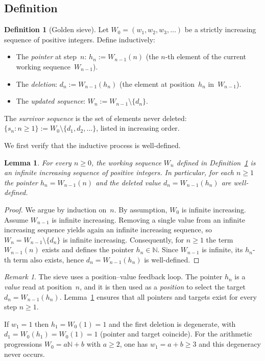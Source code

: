\documentclass[11pt]{article}
\numberwithin{equation}{section}
\theoremstyle{plain}
\newtheorem{lemma}[theorem]{Lemma}
\theoremstyle{definition}
\newtheorem{definition}[theorem]{Definition}
\theoremstyle{remark}
\newtheorem{remark}[theorem]{Remark}
\newcommand{\N}{\mathbb{N}}
\begin{document}
\subsection{Definition}

\begin{definition}[Golden sieve]\label{def:sieve}
Let $W_0 = (w_1, w_2, w_3, \ldots)$ be a strictly increasing sequence
of positive integers.  Define inductively:
\begin{itemize}
\item The \emph{pointer} at step~$n$:
  $h_n := W_{n-1}(n)$ (the $n$-th element of the current working
  sequence~$W_{n-1}$).
\item The \emph{deletion}: $d_n := W_{n-1}(h_n)$ (the element at
  position~$h_n$ in~$W_{n-1}$).
\item The \emph{updated sequence}: $W_n := W_{n-1} \setminus \{d_n\}$.
\end{itemize}
The \emph{survivor sequence} is the set of elements never deleted:
$\{s_n : n \ge 1\} := W_0 \setminus \{d_1, d_2, \ldots\}$,
listed in increasing order.
\end{definition}

We first verify that the inductive process is well-defined.

\begin{lemma}\label{lem:well-defined}
For every $n\ge0$, the working sequence $W_n$ defined in
Definition~\ref{def:sieve} is an infinite increasing sequence of positive
integers. In particular, for each $n\ge1$ the pointer $h_n=W_{n-1}(n)$ and
the deleted value $d_n=W_{n-1}(h_n)$ are well-defined.
\end{lemma}

\begin{proof}
We argue by induction on~$n$. By assumption, $W_0$ is infinite increasing.
Assume $W_{n-1}$ is infinite increasing. Removing a single value from an
infinite increasing sequence yields again an infinite increasing sequence,
so $W_n=W_{n-1}\setminus\{d_n\}$ is infinite increasing.
Consequently, for $n\ge1$ the term $W_{n-1}(n)$ exists and defines the
pointer $h_n\in\N$. Since $W_{n-1}$ is infinite, its $h_n$-th term also
exists, hence $d_n=W_{n-1}(h_n)$ is well-defined.
\end{proof}

\begin{remark}%
\label{rem:degeneracy-initial}
The sieve uses a position--value feedback loop.  The pointer $h_n$ is a
\emph{value} read at position~$n$, and it is then used as a \emph{position}
to select the target $d_n=W_{n-1}(h_n)$. Lemma~\ref{lem:well-defined}
ensures that all pointers and targets exist for every step $n\ge1$.

If $w_1=1$ then $h_1=W_0(1)=1$ and the first deletion is degenerate, with
$d_1=W_0(h_1)=W_0(1)=1$ (pointer and target coincide). For the arithmetic
progressions $W_0=a\N+b$ with $a\ge2$, one has $w_1=a+b\ge3$ and this
degeneracy never occurs.
\end{remark}
\end{document}
